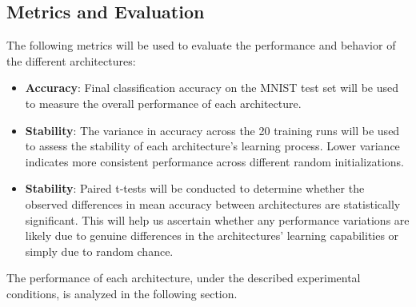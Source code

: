 \subsection{Metrics and Evaluation}
The following metrics will be used to evaluate the performance and behavior of the different architectures:
\begin{itemize}
    \item \textbf{Accuracy}: Final classification accuracy on the MNIST test set will be used to measure the overall performance of each architecture.
    \item \textbf{Stability}: The variance in accuracy across the 20 training runs will be used to assess the stability of each architecture's learning process. Lower variance indicates more consistent performance across different random initializations.
    \item \textbf{Stability}: Paired t-tests will be conducted to determine whether the observed differences in mean accuracy between architectures are statistically significant. This will help us ascertain whether any performance variations are likely due to genuine differences in the architectures' learning capabilities or simply due to random chance.
\end{itemize}

The performance of each architecture, under the described experimental conditions, is analyzed in the following section. 
